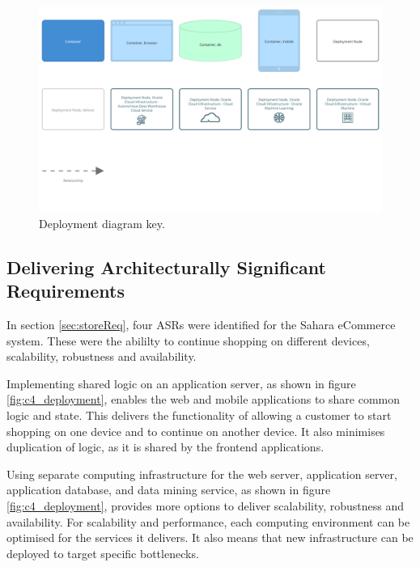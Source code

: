 \begin{figure}[h!]
    \centering
    \begin{adjustwidth}{-7.5mm}{-7.5mm}
        \includegraphics[trim=22 210 22 24,clip,width=0.95\paperwidth]{images/c4/deployment_diagram-key.png}
    \end{adjustwidth}
    \caption{Deployment diagram key.}
    \label{fig:c4_deployment_key}
\end{figure}

\subsection{Delivering Architecturally Significant Requirements}
In section \ref{sec:storeReq}, four ASRs were identified for the Sahara eCommerce system.
These were the abililty to continue shopping on different devices, scalability, robustness and availability.

Implementing shared logic on an application server, as shown in figure \ref{fig:c4_deployment},
enables the web and mobile applications to share common logic and state.
This delivers the functionality of allowing a customer to start shopping on one device and to continue on another device.
It also minimises duplication of logic, as it is shared by the frontend applications.

Using separate computing infrastructure for the web server, application server, application database, and data mining service,
as shown in figure \ref{fig:c4_deployment}, provides more options to deliver scalability, robustness and availability.
For scalability and performance, each computing environment can be optimised for the services it delivers.
It also means that new infrastructure can be deployed to target specific bottlenecks.

